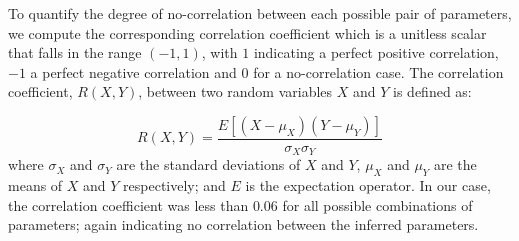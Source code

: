 To quantify the degree of no-correlation between each possible pair of parameters, we compute 
the corresponding correlation coefficient which is a unitless scalar that falls in the range 
$(-1, 1)$, with $1$ indicating a perfect positive correlation, $−1$ a perfect negative correlation and $0$ for
a no-correlation case.
The correlation coefficient, $R(X, Y )$, between two random variables $X$ and $Y$ is defined as:

\begin{equation}
R(X,Y) = \frac{E[(X - \mu_X)(Y - \mu_Y )]}{\sigma_X \sigma_Y} 
\end{equation}
where $\sigma_X$ and  $\sigma_Y$ are the standard deviations of  $X$ and $Y$, $\mu_X$
and $\mu_Y$  are the means of  $X$ and $Y$ respectively;
and $E$ is the expectation operator.  In our case, the correlation coefficient
was less than $0.06$ for all possible combinations of parameters; again indicating no correlation
between the inferred parameters.






